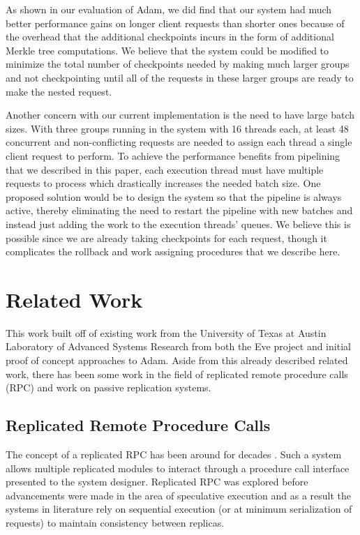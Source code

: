 \documentclass[11pt, oneside]{report}
\begin{document}
As shown in our evaluation of Adam, we did find that our system had much better performance gains on longer client requests than shorter ones because of the overhead that the additional checkpoints incurs in the form of additional Merkle tree computations. 
We believe that the system could be modified to minimize the total number of checkpoints needed by making much larger groups and not checkpointing until all of the requests in these larger groups are ready to make the nested request.

Another concern with our current implementation is the need to have large batch sizes. With three groups running in the system with 16 threads each, at least 48 concurrent and non-conflicting requests are needed to assign each thread a single client request to perform. 
To achieve the performance benefits from pipelining that we described in this paper, each execution thread must have multiple requests to process which drastically increases the needed batch size. 
One proposed solution would be to design the system so that the pipeline is always active, thereby eliminating the need to restart the pipeline with new batches and instead just adding the work to the execution threads' queues. 
We believe this is possible since we are already taking checkpoints for each request, though it complicates the rollback and work assigning procedures that we describe here.

\chapter{Related Work}\label{RelatedWork}

This work built off of existing work from the University of Texas at Austin Laboratory of Advanced Systems Research from both the Eve project and initial proof of concept approaches to Adam. Aside from this already described related work, there has been some work in the field of replicated remote procedure calls (RPC) and work on passive replication systems.

\section{Replicated Remote Procedure Calls}

The concept of a replicated RPC has been around for decades \cite{rrpc, ftrpc}.
Such a system allows multiple replicated modules to interact through a procedure call interface presented to the system designer.
Replicated RPC was explored before advancements were made in the area of speculative execution and as a result the systems in literature rely on sequential execution (or at minimum serialization of requests) to maintain consistency between replicas. 
\end{document}
